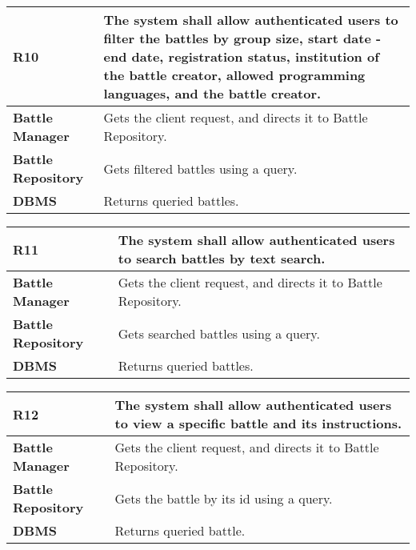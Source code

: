 \begin{table}[h!]
  \centering
  \begin{tabular}{lp{12cm}}
    \hline
    \textbf{R10} & The system shall allow authenticated users to filter the battles by group size, start date - end date, registration status, institution of the battle creator, allowed programming languages, and the battle creator. \\
    \hline
    \hline
    \textbf{Battle Manager} & Gets the client request, and directs it to Battle Repository. \\
    \textbf{Battle Repository} &  Gets filtered battles using a query.\\
    \textbf{DBMS} & Returns queried battles. \\
    \hline
  \end{tabular}
\end{table}

\begin{table}[h!]
  \centering
  \begin{tabular}{lp{12cm}}
    \hline
    \textbf{R11} & The system shall allow authenticated users to search battles by text search. \\
    \hline
    \hline
    \textbf{Battle Manager} & Gets the client request, and directs it to Battle Repository. \\
    \textbf{Battle Repository} &  Gets searched battles using a query.\\
    \textbf{DBMS} & Returns queried battles. \\
    \hline
  \end{tabular}
\end{table}

\begin{table}[h!]
  \centering
  \begin{tabular}{lp{12cm}}
    \hline
    \textbf{R12} & The system shall allow authenticated users to view a specific battle and its instructions. \\
    \hline
    \hline
    \textbf{Battle Manager} & Gets the client request, and directs it to Battle Repository. \\
    \textbf{Battle Repository} &   Gets the battle by its id using a query.\\
    \textbf{DBMS} & Returns queried battle. \\
    \hline
  \end{tabular}
\end{table}

